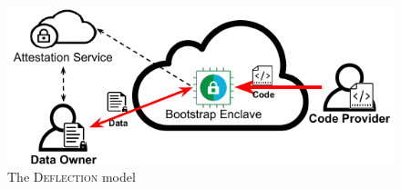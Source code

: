 \begin{figure}[htbp]
\centerline{\includegraphics[scale=0.72]{figures/fg-deflection-model.pdf}}
\caption{The \textsc{Deflection} model}\label{fg-cat}
\vspace{-12pt}
\end{figure}